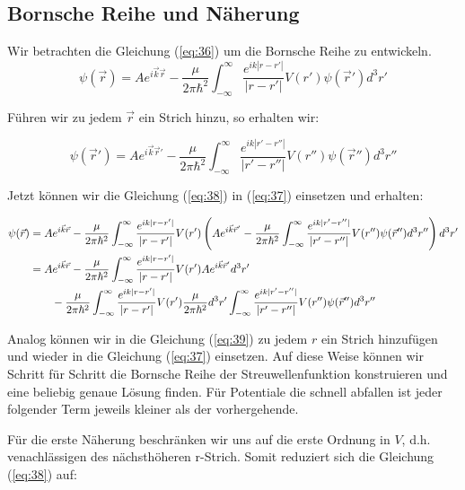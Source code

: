 \subsection*{Bornsche Reihe und Näherung}

Wir betrachten die Gleichung (\ref{eq:36}) um die Bornsche Reihe zu entwickeln. 
\begin{equation}
  \label{eq:37}
  \psi(\vec r) =  Ae^{i\vec k \vec r}  -\frac{\mu}{2\pi\hbar^2} \int_{-\infty}^\infty \frac{ e^{ik |r-r'| }}{|r-r'|  }  V(r')\psi(\vec r') d^3 r'
\end{equation}

Führen wir zu jedem \(\vec r\) ein Strich hinzu, so erhalten wir:

\begin{equation}
  \label{eq:38}
  \psi(\vec r') =  Ae^{i\vec k \vec r'}  -\frac{\mu}{2\pi\hbar^2} \int_{-\infty}^\infty \frac{ e^{ik |r'-r''| }}{|r'-r''|  }  V(r'')\psi(\vec r'') d^3 r''
\end{equation}

Jetzt können wir die Gleichung (\ref{eq:38}) in (\ref{eq:37}) einsetzen und erhalten:

\begin{align}
  \label{eq:39}
   \psi(\vec r) &=  Ae^{i\vec k \vec r}  -\frac{\mu}{2\pi\hbar^2} \int_{-\infty}^\infty \frac{ e^{ik |r-r'| }}{|r-r'|  }  V(r')\left(  Ae^{i\vec k \vec r'}  -\frac{\mu}{2\pi\hbar^2} \int_{-\infty}^\infty \frac{ e^{ik |r'-r''| }}{|r'-r''|  }  V(r'')\psi(\vec r'') d^3 r''  \right)  d^3 r'\notag\\
&=  Ae^{i\vec k \vec r}  -\frac{\mu}{2\pi\hbar^2} \int_{-\infty}^\infty \frac{ e^{ik |r-r'| }}{|r-r'|  }  V(r') Ae^{i\vec k \vec r'}d^3 r' \notag\\
&\qquad -  \frac{\mu}{2\pi\hbar^2} \int_{-\infty}^\infty \frac{ e^{ik |r-r'| }}{|r-r'|  }  V(r')   \frac{\mu}{2\pi\hbar^2} d^3 r' \int_{-\infty}^\infty \frac{ e^{ik |r'-r''| }}{|r'-r''|  }  V(r'')\psi(\vec r'') d^3 r''
\end{align}


Analog können wir in die Gleichung (\ref{eq:39}) zu jedem \(r\) ein Strich hinzufügen und wieder in die Gleichung (\ref{eq:37}) einsetzen. Auf diese Weise können wir Schritt für Schritt die Bornsche Reihe der Streuwellenfunktion konstruieren und eine beliebig genaue Lösung finden. Für Potentiale die schnell abfallen ist jeder folgender Term jeweils kleiner als der vorhergehende.

Für die erste Näherung beschränken wir uns auf die erste Ordnung in \(V\), d.h. venachlässigen des nächsthöheren r-Strich. Somit reduziert sich die Gleichung (\ref{eq:38}) auf:

